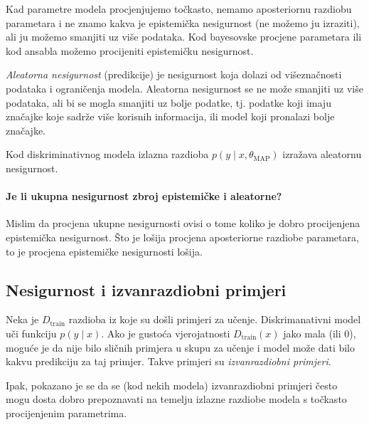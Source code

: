 \documentclass{article}
\begin{document}
Kad parametre modela procjenjujemo točkasto, nemamo aposteriornu razdiobu parametara i ne znamo kakva je epistemička nesigurnost (ne možemo ju izraziti), ali ju možemo smanjiti uz više podataka. Kod bayesovske procjene parametara ili kod ansabla možemo procijeniti epistemičku nesigurnost.

\emph{Aleatorna nesigurnost} (predikcije) je nesigurnost koja dolazi od višeznačnosti podataka i ograničenja modela. Aleatorna nesigurnost se ne može smanjiti uz više podataka, ali bi se mogla smanjiti uz bolje podatke, tj. podatke koji imaju značajke koje sadrže više korisnih informacija, ili model koji pronalazi bolje značajke.

Kod diskriminativnog modela izlazna razdioba $p(y\mid x, \theta_\text{MAP})$ izražava aleatornu nesigurnost.

\paragraph{Je li ukupna nesigurnost zbroj epistemičke i aleatorne?}
Mislim da procjena ukupne nesigurnosti ovisi o tome koliko je dobro procijenjena epistemička nesigurnost. Što je lošija procjena aposteriorne razdiobe parametara, to je procjena epistemičke nesigurnosti lošija.


\subsection{Nesigurnost i izvanrazdiobni primjeri}

Neka je $D_{\text{train}}$ razdioba iz koje su došli primjeri za učenje. Diskrimanativni model uči funkciju $p(y\mid x)$. Ako je gustoća vjerojatnosti $D_{\text{train}}(x)$ jako mala (ili $0$), moguće je da nije bilo sličnih primjera u skupu za učenje i model može dati bilo kakvu predikciju za taj primjer. Takve primjeri su \emph{izvanrazdiobni primjeri}.

Ipak, pokazano je se da se (kod nekih modela) izvanrazdiobni primjeri često mogu dosta dobro prepoznavati na temelju izlazne razdiobe modela s točkasto procijenjenim parametrima. 
\end{document}
